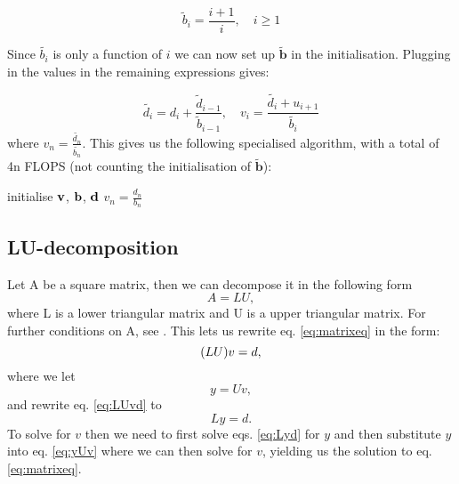 	\begin{equation}
	\widetilde{b}_i = \frac{i+1}{i}, \quad i \geq 1
	\end{equation}

Since $\widetilde{b_i}$ is only a function of $i$ we can now set up $\mathbf{\widetilde{b}}$ in the initialisation. Plugging in the values in the remaining expressions gives:

	\begin{equation}
	\widetilde{d_i} = d_i + \frac{\widetilde{d}_{i-1}}{\widetilde{b}_{i-1}}, \quad
	v_i = \frac{\widetilde{d_i}+u_{i+1}}{\widetilde{b_i}}
	\end{equation}
where $v_n = \frac{\widetilde{d_n}}{\widetilde{b_n}}$. This gives us the following specialised algorithm, with a total of 4n FLOPS (not counting the initialisation of $\mathbf{\widetilde{b}}$):

	\begin{algorithm}[h!]
	\SetAlgoLined
	initialise $\vb{v}$, $\vb{b}$, $\vb{d}$\;
	$v_n = \frac{d_n}{b_n}$\;
	\end{algorithm}



\subsection{LU-decomposition}
\label{sec:LU}

Let A be a square matrix, then we can decompose it in the following form
  \begin{equation}
    A = LU,
  \end{equation}
where L is a lower triangular matrix and U is a upper triangular matrix. For
further conditions on A, see \cite{LUref}. This lets us rewrite eq.
\ref{eq:matrixeq} in the form:
  \begin{equation}
    \label{eq:LUvd}
    \qty(LU)v = d,
  \end{equation}
where we let
  \begin{equation}
    \label{eq:yUv}
    y = Uv,
  \end{equation}
  and rewrite eq. \ref{eq:LUvd} to
  \begin{equation}
    \label{eq:Lyd}
    Ly = d.
  \end{equation}
To solve for $v$ then we need to first solve eqs. \ref{eq:Lyd} for $y$ and then
substitute $y$ into eq. \ref{eq:yUv} where we can then solve for $v$, yielding
us the solution to eq. \ref{eq:matrixeq}.

